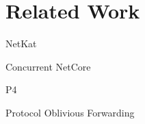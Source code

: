 \section{Related Work}

NetKat\cite{netkat}

Concurrent NetCore\cite{cnetcore}

P4\cite{p4}

Protocol Oblivious Forwarding\cite{pof}



